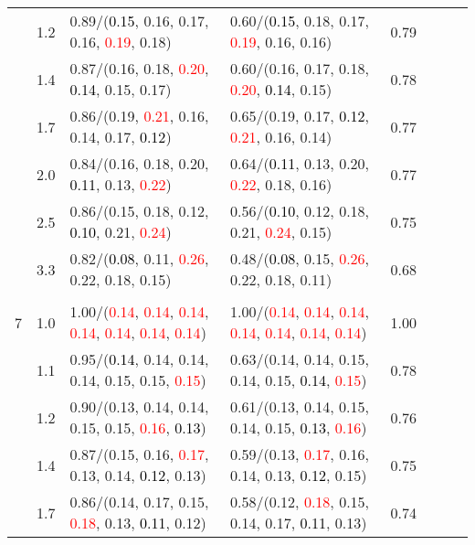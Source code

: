 \documentclass[10pt,a4paper]{report}
\begin{document}
\begin{table}[!htbp]
\begin{center}
{\begin{tabular}{ccllcccc}
			&1.2&0.89/(\textcolor{black}{0.15}, 0.16, 0.17, 0.16, \textcolor{red}{0.19}, 0.18)&0.60/(\textcolor{black}{0.15}, 0.18, 0.17, \textcolor{red}{0.19}, 0.16, 0.16)&0.79\\
			&1.4&0.87/(0.16, 0.18, \textcolor{red}{0.20}, \textcolor{black}{0.14}, 0.15, 0.17)&0.60/(0.16, 0.17, 0.18, \textcolor{red}{0.20}, \textcolor{black}{0.14}, 0.15)&0.78\\
			&1.7&0.86/(0.19, \textcolor{red}{0.21}, 0.16, 0.14, 0.17, \textcolor{black}{0.12})&0.65/(0.19, 0.17, \textcolor{black}{0.12}, \textcolor{red}{0.21}, 0.16, 0.14)&0.77\\
			&2.0&0.84/(0.16, 0.18, 0.20, \textcolor{black}{0.11}, 0.13, \textcolor{red}{0.22})&0.64/(\textcolor{black}{0.11}, 0.13, 0.20, \textcolor{red}{0.22}, 0.18, 0.16)&0.77\\
			&2.5&0.86/(0.15, 0.18, 0.12, \textcolor{black}{0.10}, 0.21, \textcolor{red}{0.24})&0.56/(\textcolor{black}{0.10}, 0.12, 0.18, 0.21, \textcolor{red}{0.24}, 0.15)&0.75\\
			&3.3&0.82/(\textcolor{black}{0.08}, 0.11, \textcolor{red}{0.26}, 0.22, 0.18, 0.15)&0.48/(\textcolor{black}{0.08}, 0.15, \textcolor{red}{0.26}, 0.22, 0.18, 0.11)&0.68\\
			&&&&\\
			7			&1.0&1.00/(\textcolor{red}{0.14}, \textcolor{red}{0.14}, \textcolor{red}{0.14}, \textcolor{red}{0.14}, \textcolor{red}{0.14}, \textcolor{red}{0.14}, \textcolor{red}{0.14})&1.00/(\textcolor{red}{0.14}, \textcolor{red}{0.14}, \textcolor{red}{0.14}, \textcolor{red}{0.14}, \textcolor{red}{0.14}, \textcolor{red}{0.14}, \textcolor{red}{0.14})&1.00\\
			&1.1&0.95/(\textcolor{black}{0.14}, 0.14, 0.14, 0.14, 0.15, 0.15, \textcolor{red}{0.15})&0.63/(0.14, 0.14, 0.15, 0.14, 0.15, \textcolor{black}{0.14}, \textcolor{red}{0.15})&0.78\\
			&1.2&0.90/(0.13, 0.14, 0.14, 0.15, 0.15, \textcolor{red}{0.16}, \textcolor{black}{0.13})&0.61/(0.13, 0.14, 0.15, 0.14, 0.15, \textcolor{black}{0.13}, \textcolor{red}{0.16})&0.76\\
			&1.4&0.87/(0.15, 0.16, \textcolor{red}{0.17}, 0.13, 0.14, \textcolor{black}{0.12}, 0.13)&0.59/(0.13, \textcolor{red}{0.17}, 0.16, 0.14, 0.13, \textcolor{black}{0.12}, 0.15)&0.75\\
			&1.7&0.86/(0.14, 0.17, 0.15, \textcolor{red}{0.18}, 0.13, \textcolor{black}{0.11}, 0.12)&0.58/(0.12, \textcolor{red}{0.18}, 0.15, 0.14, 0.17, \textcolor{black}{0.11}, 0.13)&0.74\\

\end{tabular}}
\end{center}
\end{table}
\end{document}
